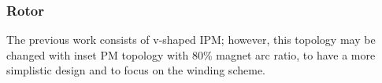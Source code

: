 \documentclass[11pt, a4paper]{article}
\begin{document}
	\subsubsection{Rotor}
	The previous work consists of v-shaped IPM; however, this topology may be changed with inset PM topology with 80\% magnet arc ratio, to have a more simplistic design and to focus on the winding scheme.

	
	\newpage
	
	{}
	
\end{document}
